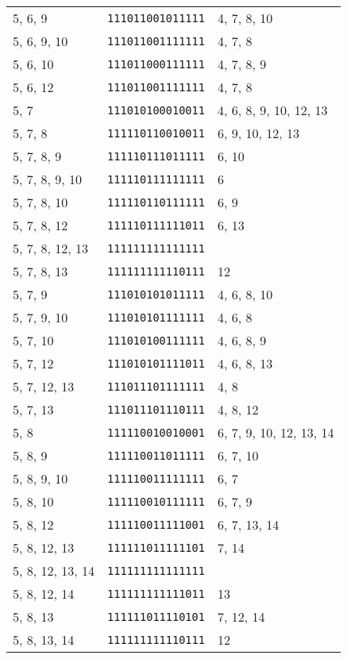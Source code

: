\documentclass[a4paper,12pt]{article}
\begin{document}
\begin{longtable}{l|l|l}
        5, 6, 9&\texttt{111011001011111}&4, 7, 8, 10\\
        5, 6, 9, 10&\texttt{111011001111111}&4, 7, 8\\
        5, 6, 10&\texttt{111011000111111}&4, 7, 8, 9\\
        5, 6, 12&\texttt{111011001111111}&4, 7, 8\\
        5, 7&\texttt{111010100010011}&4, 6, 8, 9, 10, 12, 13\\
        5, 7, 8&\texttt{111110110010011}&6, 9, 10, 12, 13\\
        5, 7, 8, 9&\texttt{111110111011111}&6, 10\\
        5, 7, 8, 9, 10&\texttt{111110111111111}&6\\
        5, 7, 8, 10&\texttt{111110110111111}&6, 9\\
        5, 7, 8, 12&\texttt{111110111111011}&6, 13\\
        5, 7, 8, 12, 13&\texttt{111111111111111}&\\
        5, 7, 8, 13&\texttt{111111111110111}&12\\
        5, 7, 9&\texttt{111010101011111}&4, 6, 8, 10\\
        5, 7, 9, 10&\texttt{111010101111111}&4, 6, 8\\
        5, 7, 10&\texttt{111010100111111}&4, 6, 8, 9\\
        5, 7, 12&\texttt{111010101111011}&4, 6, 8, 13\\
        5, 7, 12, 13&\texttt{111011101111111}&4, 8\\
        5, 7, 13&\texttt{111011101110111}&4, 8, 12\\
        5, 8&\texttt{111110010010001}&6, 7, 9, 10, 12, 13, 14\\
        5, 8, 9&\texttt{111110011011111}&6, 7, 10\\
        5, 8, 9, 10&\texttt{111110011111111}&6, 7\\
        5, 8, 10&\texttt{111110010111111}&6, 7, 9\\
        5, 8, 12&\texttt{111110011111001}&6, 7, 13, 14\\
        5, 8, 12, 13&\texttt{111111011111101}&7, 14\\
        5, 8, 12, 13, 14&\texttt{111111111111111}&\\
        5, 8, 12, 14&\texttt{111111111111011}&13\\
        5, 8, 13&\texttt{111111011110101}&7, 12, 14\\
        5, 8, 13, 14&\texttt{111111111110111}&12\\

\end{longtable}
\end{document}
